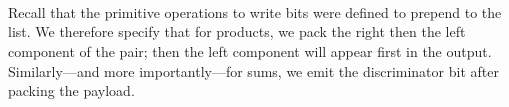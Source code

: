 \documentclass[fleqn,runningheads]{llncs}
\begin{document}
\begin{AgdaAlign}
\begin{code}
\AgdaSpace{}%
\<%
\\
%
\>[2]\AgdaSpace{}%
\AgdaSymbol{(}\AgdaSpace{}%
\AgdaSpace{}%
\AgdaSymbol{)}%
\>[19]\AgdaSpace{}%
%
\>[34]\AgdaSymbol{=}\AgdaSpace{}%
\AgdaSpace{}%
\AgdaSpace{}%
\AgdaSpace{}%
\AgdaSpace{}%
\AgdaSpace{}%
\AgdaSpace{}%
\AgdaSymbol{(}\AgdaSpace{}%
\AgdaSpace{}%
\AgdaSpace{}%
\AgdaSymbol{)}\<%
\\
%
\>[2]\AgdaSpace{}%
%
\>[19]\AgdaSpace{}%
%
\>[34]\AgdaSymbol{=}\AgdaSpace{}%
\<%
\\
%
\>[2]\AgdaSpace{}%
%
\>[19]\AgdaSpace{}%
%
\>[34]\AgdaSymbol{=}\AgdaSpace{}%
\<%
\end{code}
Recall that the primitive operations to write bits were defined to prepend to the list. We therefore specify that
for products, we pack the right then the left component of the pair; then the left component will appear first in the output. Similarly---and more importantly---for sums, we emit the discriminator bit after packing the payload.


\end{AgdaAlign}
\end{document}
